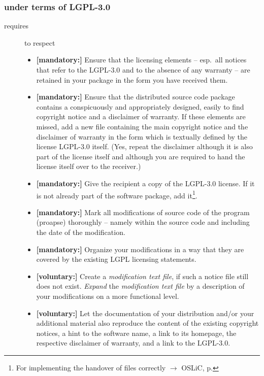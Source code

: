 \subsubsection{under terms of LGPL-3.0}

\begin{description}
\item[requires] to respect
\begin{itemize}
  
  \item \textbf{[mandatory:]} Ensure that the licensing elements -- esp.\ all
  notices that refer to the LGPL-3.0 and to the absence of any
  warranty -- are retained in your package in the form you have received them.

  \item \textbf{[mandatory:]} Ensure that the distributed source code package
  contains a conspicuously and appropriately designed, easily to find copyright
  notice and a disclaimer of warranty. If these elements are missed, add a new
  file containing the main copyright notice and the disclaimer of warranty in the
  form which is textually defined by the license LGPL-3.0 itself. (Yes, repeat
  the disclaimer although it is also part of the license itself and although you
  are required to hand the license itself over to the receiver.)
  
  \item \textbf{[mandatory:]} Give the recipient a copy of the LGPL-3.0 license.
  If it is not already part of the software package, add it\footnote{For
  implementing the handover of files correctly $\rightarrow$ OSLiC, p.
  \pageref{DistributingFilesHint}}.

  \item \textbf{[mandatory:]} Mark all modifications of source code of the
  program (proapse) thoroughly -- namely within the source code and including
  the date of the modification.
  
  \item \textbf{[mandatory:]} Organize your modifications in a way that they are
  covered by the existing LGPL licensing statements.
  
  \item \textbf{[voluntary:]} Create a \emph{modification text file}, if such a
  notice file still does not exist. \emph{Expand} the \emph{modification text
  file} by a description of your modifications on a more functional level.
    
  \item \textbf{[voluntary:]} Let the documentation of your distribution and/or
  your additional material also reproduce the content of the existing
  copyright notices, a hint to the software name, a link to its homepage,
  the respective disclaimer of warranty, and a link to the LGPL-3.0.
  

\end{itemize}
\end{description}
